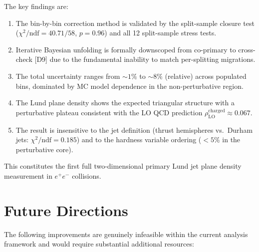 \documentclass[11pt,a4paper]{article}
\begin{document}
The key findings are:
\begin{enumerate}
\item The bin-by-bin correction method is validated by the
  split-sample closure test ($\chi^2/\text{ndf} = 40.71/58$,
  $p = 0.96$) and all 12 split-sample stress tests.
\item Iterative Bayesian unfolding is formally downscoped from
  co-primary to cross-check [D9] due to the fundamental inability
  to match per-splitting migrations.
\item The total uncertainty ranges from $\sim\!1\%$ to $\sim\!8\%$
  (relative) across populated bins, dominated by MC model dependence
  in the non-perturbative region.
\item The Lund plane density shows the expected triangular structure
  with a perturbative plateau consistent with the LO QCD prediction
  $\rho_\text{LO}^\text{charged} \approx 0.067$.
\item The result is insensitive to the jet definition (thrust
  hemispheres vs.\ Durham jets: $\chi^2/\text{ndf} = 0.185$) and
  to the hardness variable ordering ($<\!5\%$ in the perturbative core).
\end{enumerate}

This constitutes the first full two-dimensional primary Lund jet plane
density measurement in $e^+e^-$ collisions.

\section{Future Directions}
\label{sec:future}

The following improvements are genuinely infeasible within the current
analysis framework and would require substantial additional resources:
\end{document}
